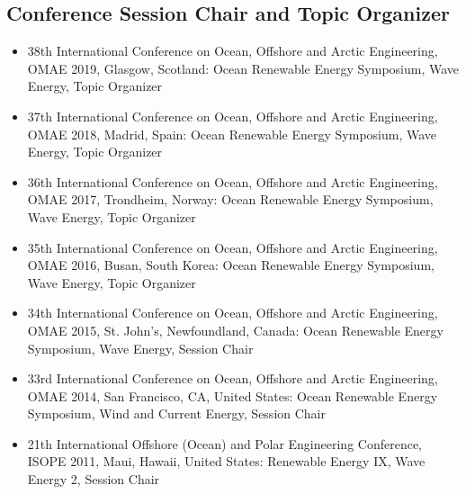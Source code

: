 \documentclass[10pt]{article}
\begin{document}
\subsection*{Conference Session Chair and Topic Organizer}
\begin{itemize}[leftmargin=*]
\setlength{\itemsep}{-0.5mm}
\item 38th International Conference on Ocean, Offshore and Arctic Engineering, OMAE 2019, Glasgow, Scotland: Ocean Renewable Energy Symposium, Wave Energy, Topic Organizer
\item 37th International Conference on Ocean, Offshore and Arctic Engineering, OMAE 2018, Madrid, Spain: Ocean Renewable Energy Symposium, Wave Energy, Topic Organizer
\item 36th International Conference on Ocean, Offshore and Arctic Engineering, OMAE 2017, Trondheim, Norway: Ocean Renewable Energy Symposium, Wave Energy, Topic Organizer
\item 35th International Conference on Ocean, Offshore and Arctic Engineering, OMAE 2016, Busan, South Korea: Ocean Renewable Energy Symposium, Wave Energy, Topic Organizer
\item 34th International Conference on Ocean, Offshore and Arctic Engineering, OMAE 2015, St. John's, Newfoundland, Canada: Ocean Renewable Energy Symposium, Wave Energy, Session Chair
\item 33rd International Conference on Ocean, Offshore and Arctic Engineering, OMAE 2014, San Francisco, CA, United States: Ocean Renewable Energy Symposium, Wind and Current Energy, Session Chair
\item 21th International Offshore (Ocean) and Polar Engineering Conference, ISOPE 2011, Maui, Hawaii, United States: Renewable Energy IX, Wave Energy 2, Session Chair
\end{itemize}
\end{document}
